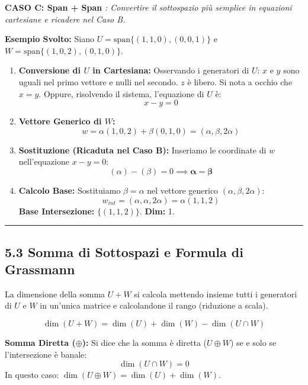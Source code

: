 \documentclass[10pt,a4paper]{article}
\begin{document}
\vspace{0.5cm}

\textbf{CASO C: Span + Span}
\textit{: Convertire il sottospazio più semplice in equazioni cartesiane e ricadere nel Caso B.}



\textbf{Esempio Svolto:}
Siano $U = \text{span}\{ (1, 1, 0), (0, 0, 1) \}$ e $W = \text{span}\{ (1, 0, 2), (0, 1, 0) \}$.

\begin{enumerate}
    \item \textbf{Conversione di $U$ in Cartesiana:}
    Osservando i generatori di $U$: $x$ e $y$ sono uguali nel primo vettore e nulli nel secondo. $z$ è libero.
    Si nota a occhio che $x = y$. Oppure, risolvendo il sistema, l'equazione di $U$ è:
    \[ x - y = 0 \]
    
    \item \textbf{Vettore Generico di $W$:}
    \[ w = \alpha(1, 0, 2) + \beta(0, 1, 0) = (\alpha, \beta, 2\alpha) \]
    
    \item \textbf{Sostituzione (Ricaduta nel Caso B):}
    Inseriamo le coordinate di $w$ nell'equazione $x - y = 0$:
    \[ (\alpha) - (\beta) = 0 \implies \mathbf{\alpha = \beta} \]
    
    \item \textbf{Calcolo Base:}
    Sostituiamo $\beta = \alpha$ nel vettore generico $(\alpha, \beta, 2\alpha)$:
    \[ w_{int} = (\alpha, \alpha, 2\alpha) = \alpha(1, 1, 2) \]
    \textbf{Base Intersezione:} $\{ (1, 1, 2) \}$. \textbf{Dim:} 1.
\end{enumerate}

\vspace{0.3cm}
\hrule
\vspace{0.3cm}

\subsection*{5.3 Somma di Sottospazi e Formula di Grassmann}
La dimensione della somma $U+W$ si calcola mettendo insieme tutti i generatori di $U$ e $W$ in un'unica matrice e calcolandone il rango (riduzione a scala).

\begin{tcolorbox}[colback=yellow!10!white,colframe=orange!85!black,title=\textbf{FORMULA DI GRASSMANN}]
\[ \dim(U + W) = \dim(U) + \dim(W) - \dim(U \cap W) \]

\textbf{Somma Diretta ($\oplus$):}
Si dice che la somma è diretta ($U \oplus W$) se e solo se l'intersezione è banale:
\[ \dim(U \cap W) = 0 \]
In questo caso: $\dim(U \oplus W) = \dim(U) + \dim(W)$.
\end{tcolorbox}
\vspace{0.5cm}
\end{document}

